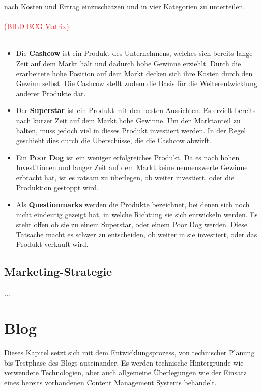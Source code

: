   nach Kosten und Ertrag einzuschätzen und in vier Kategorien zu unterteilen.\\
  \\
  \textcolor{red}{(BILD BCG-Matrix)}\\
  \\
  \begin{itemize}
    \item Die \textbf{Cashcow} ist ein Produkt des Unternehmens, welches sich bereits lange Zeit auf dem Markt hält und dadurch hohe Gewinne erziehlt. Durch die
    erarbeitete hohe Position auf dem Markt decken sich ihre Kosten durch den Gewinn selbst. Die Cashcow stellt zudem die Basis für die Weiterentwicklung anderer
    Produkte dar.

    \item Der \textbf{Superstar} ist ein Produkt mit den besten Aussichten. Es erzielt bereits nach kurzer Zeit auf dem Markt hohe Gewinne. Um den Marktanteil
    zu halten, muss jedoch viel in dieses Produkt investiert werden. In der Regel geschieht dies durch die Überschüsse, die die Cashcow abwirft.

    \item Ein \textbf{Poor Dog} ist ein weniger erfolgreiches Produkt. Da es nach hohen Investitionen und langer Zeit auf dem Markt keine nennenswerte
    Gewinne erbracht hat, ist es ratsam zu überlegen, ob weiter investiert, oder die Produktion gestoppt wird.

    \item Als \textbf{Questionmarks} werden die Produkte bezeichnet, bei denen sich noch nicht eindeutig gezeigt hat, in welche Richtung sie sich entwickeln werden.
    Es steht offen ob sie zu einem Superstar, oder einem Poor Dog werden. Diese Tatsache macht es schwer zu entscheiden, ob weiter in sie investiert, oder das Produkt
    verkauft wird.
  \end{itemize}

  \subsection{Marketing-Strategie}
  ...

\section{Blog}
Dieses Kapitel setzt sich mit dem Entwicklungsprozess, von technischer Planung bis Testphase
des Blogs auseinander. Es werden technische Hintergründe wie verwendete Technologien, aber
auch allgemeine Überlegungen wie der Einsatz eines bereits vorhandenen Content Management Systems
behandelt.
